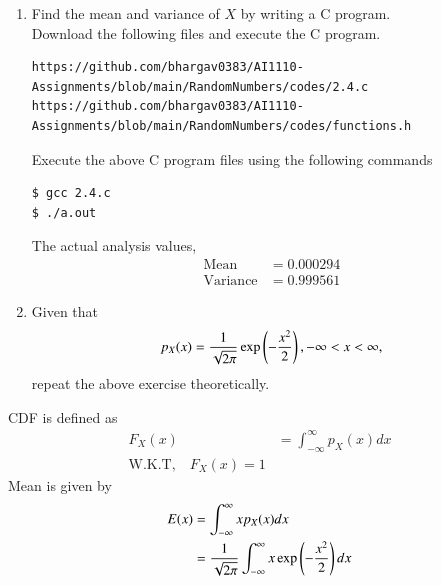 \documentclass[journal,12pt,twocolumn]{IEEEtran}
\renewcommand\thesection{\arabic{section}}
\begin{document}
\begin{enumerate}[label=\thesection.\arabic*
,ref=\thesection.\theenumi]
\begin{align}
                        &= \frac{1}{2}\brak{\frac{2}{\sqrt{\pi}}\int_{x/\sqrt{2}}^{\infty}e^{-t^2}dt}\\
                        &= \frac{1}{2}\brak{1-\frac{2}{\sqrt{\pi}}\int_{0}^{x/\sqrt{2}}e^{-t^2}dt}\\
                        &= \frac{1}{2} - \frac{1}{2}\text{erf}\brak{\frac{x}{\sqrt{2}}}
\end{align}
Where erf() is error function defined as,
\begin{align}
    \text{erf(z)}=\frac{2}{\sqrt{\pi}}\int_{0}^{z}e^{-t^2}dt
\end{align}
\item Find the mean and variance of $X$ by writing a C program.\\
\solution Download the following files and execute the  C program.
\begin{lstlisting}
https://github.com/bhargav0383/AI1110-Assignments/blob/main/RandomNumbers/codes/2.4.c
https://github.com/bhargav0383/AI1110-Assignments/blob/main/RandomNumbers/codes/functions.h
\end{lstlisting}
Execute the above C program files using the following commands
\begin{lstlisting}
$ gcc 2.4.c
$ ./a.out
\end{lstlisting}
The actual analysis values,
\begin{align}
    \text{Mean}&= 0.000294 \\
    \text{Variance} &= 0.999561
\end{align}
\item Given that 
\begin{align}
p_{X}(x) = \frac{1}{\sqrt{2\pi}}\exp\left(-\frac{x^2}{2}\right), -\infty < x < \infty,
\end{align}
repeat the above exercise theoretically.
\end{enumerate}
\solution 
CDF is defined as
    \begin{align}
        F_X(x)&=\int_{-\infty}^{\infty}p_X(x)dx\\
        \text{W.K.T,} \quad \boxed{F_X(x)=1}
    \end{align}
Mean is given by
    \begin{align}
        E(x)&=\int_{-\infty}^{\infty}xp_X(x)dx\\\
            &=\frac{1}{\sqrt{2\pi}}\int_{-\infty}^{\infty}x\exp\left(-\frac{x^2}{2}\right)dx
    \end{align}
\end{document}
